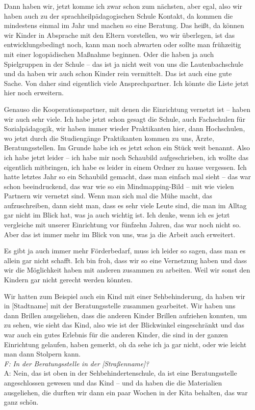 \begin{linenumbers*}
Dann haben wir, jetzt komme ich zwar schon zum nächsten, aber egal, also wir haben auch zu der sprachheilpädagogischen Schule Kontakt, da kommen die mindestens einmal im Jahr und machen so eine Beratung. Das heißt, da können wir Kinder in Absprache mit den Eltern vorstellen, wo wir überlegen, ist das entwicklungsbedingt noch, kann man noch abwarten oder sollte man frühzeitig mit einer logopädischen Maßnahme beginnen. Oder die haben ja auch Spielgruppen in der Schule -- das ist ja nicht weit von uns die Lautenbachschule und da haben wir auch schon Kinder rein vermittelt. Das ist auch eine gute Sache. Von daher sind eigentlich viele Ansprechpartner. Ich könnte die Liste jetzt hier noch erweitern. 

Genauso die Kooperationspartner, mit denen die Einrichtung vernetzt ist -- haben wir auch sehr viele. Ich habe jetzt schon gesagt die Schule, auch Fachschulen für Sozialpädagogik, wir haben immer wieder Praktikanten hier, dann Hochschulen, wo jetzt durch die Studiengänge Praktikanten kommen zu uns, Ärzte, Beratungsstellen. Im Grunde habe ich es jetzt schon ein Stück weit benannt.
Also ich habe jetzt leider -- ich habe mir noch Schaubild aufgeschrieben, ich wollte das eigentlich mitbringen, ich habe es leider in einem Ordner zu hause vergessen. Ich hatte letztes Jahr so ein Schaubild gemacht, dass man einfach mal sieht -- das war schon beeindruckend, das war wie so ein Mindmapping-Bild -- mit wie vielen Partnern wir vernetzt sind. Wenn man sich mal die Mühe macht, das aufzuschreiben, dann sieht man, dass es sehr viele Leute sind, die man im Alltag gar nicht im Blick hat, was ja auch wichtig ist. Ich denke, wenn ich es jetzt vergleiche mit unserer Einrichtung vor fünfzehn Jahren, das war noch nicht so. Aber das ist immer mehr im Blick von uns, was ja die Arbeit auch erweitert. 

Es gibt ja auch immer mehr Förderbedarf, muss ich leider so sagen, dass man es allein gar nicht schafft. Ich bin froh, dass wir so eine Vernetzung haben und dass wir die Möglichkeit haben mit anderen zusammen zu arbeiten. Weil wir sonst den Kindern gar nicht gerecht werden könnten.  

Wir hatten zum Beispiel auch ein Kind mit einer Sehbehinderung, da haben wir in [Stadtname] mit der Beratungsstelle zusammen gearbeitet. Wir haben uns dann Brillen ausgeliehen, dass die anderen Kinder Brillen aufziehen konnten, um zu sehen, wie sieht das Kind, also wie ist der Blickwinkel eingeschränkt und das war auch ein gutes Erlebnis für die anderen Kinder, die sind in der ganzen Einrichtung gelaufen, haben gemerkt, oh da sehe ich ja gar nicht, oder wie leicht man dann Stolpern kann.\\ 
\emph{F: In der Beratungsstelle in der [Straßenname]?}\\
A: Nein, das ist oben in der Sehbehindertenschule, da ist eine Beratungsstelle angeschlossen gewesen und das Kind -- und da haben die die Materialien ausgeliehen, die durften wir dann ein paar Wochen in der Kita behalten, das war ganz schön.  


\end{linenumbers*}
